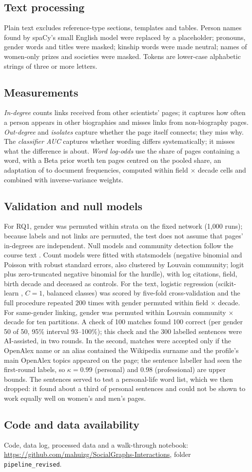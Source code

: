 \documentclass[9pt,twocolumn,twoside,lineno]{pnas-new}
\begin{document}
\subsection*{Text processing}
Plain text excludes reference-type sections, templates and tables. Person names found by spaCy's small English model were replaced by a placeholder; pronouns, gender words and titles were masked; kinship words were made neutral; names of women-only prizes and societies were masked. Tokens are lower-case alphabetic strings of three or more letters.

\subsection*{Measurements}
\emph{In-degree} counts links received from other scientists' pages; it captures how often a person appears in other biographies and misses links from non-biography pages. \emph{Out-degree} and \emph{isolates} capture whether the page itself connects; they miss why. The \emph{classifier AUC} captures whether wording differs systematically; it misses what the difference is about. \emph{Word log-odds} use the share of pages containing a word, with a Beta prior worth ten pages centred on the pooled share, an adaptation of \cite{monroe2008fightin} to document frequencies, computed within field $\times$ decade cells and combined with inverse-variance weights.

\subsection*{Validation and null models}
For RQ1, gender was permuted within strata on the fixed network (1,000 runs); because labels and not links are permuted, the test does not assume that pages' in-degrees are independent. Null models and community detection follow the course text \cite{coscia2025atlas}. Count models were fitted with statsmodels \cite{seabold2010statsmodels} (negative binomial and Poisson with robust standard errors, also clustered by Louvain community; logit plus zero-truncated negative binomial for the hurdle), with log citations, field, birth decade and deceased as controls. For the text, logistic regression (scikit-learn \cite{pedregosa2011scikit}, $C=1$, balanced classes) was scored by five-fold cross-validation and the full procedure repeated 200 times with gender permuted within field $\times$ decade. For same-gender linking, gender was permuted within Louvain community $\times$ decade for ten partitions. A check of 100 matches found 100 correct (per gender 50 of 50, 95\% interval 93--100\%); this check and the 300 labelled sentences were AI-assisted, in two rounds. In the second, matches were accepted only if the OpenAlex name or an alias contained the Wikipedia surname and the profile's main OpenAlex topics appeared on the page; the sentence labeller had seen the first-round labels, so $\kappa=0.99$ (personal) and $0.98$ (professional) are upper bounds. The sentences served to test a personal-life word list, which we then dropped: it found about a third of personal sentences and could not be shown to work equally well on women's and men's pages.

\subsection*{Code and data availability}
Code, data log, processed data and a walk-through notebook: \url{https://github.com/mahuizg/SocialGraphs-Interactions}, folder \texttt{pipeline\_revised}.


\end{document}
